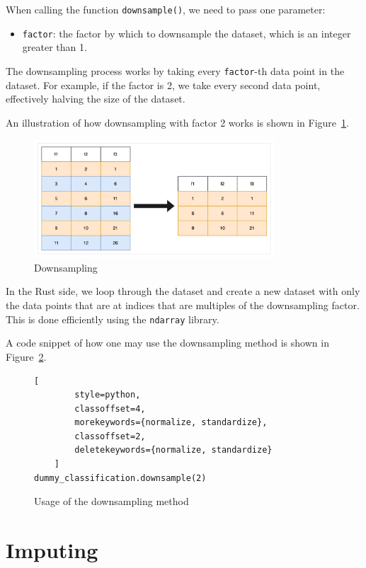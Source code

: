 \documentclass[review]{AIM_report}
\begin{document}
When calling the function \verb|downsample()|, we need to pass one parameter:
\begin{itemize}
    \item \verb|factor|: the factor by which to downsample the dataset, which is an integer greater than 1.
\end{itemize}

The downsampling process works by taking every \verb|factor|-th data point in the dataset. For example, if the factor is 2, we take every second data point, effectively halving the size of the dataset.

An illustration of how downsampling with factor 2 works is shown in Figure~\ref{fig:downsampling}.
\begin{figure}
    \centering
    \includegraphics[width=0.8\textwidth]{files/downsampling/downsampling.png}
    \caption{Downsampling}
    \label{fig:downsampling}
\end{figure}

In the Rust side, we loop through the dataset and create a new dataset with only the data points that are at indices that are multiples of the downsampling factor. This is done efficiently using the \texttt{ndarray} library.

A code snippet of how one may use the downsampling method is shown in Figure~\ref{fig:usage_downsampling}.
\begin{figure}[H]
    \begin{lstlisting}[
        style=python, 
        classoffset=4, 
        morekeywords={normalize, standardize}, 
        classoffset=2, 
        deletekeywords={normalize, standardize}
    ]
dummy_classification.downsample(2)
    \end{lstlisting}
    \caption{Usage of the downsampling method}
    \label{fig:usage_downsampling}
\end{figure}

\newpage
\section{Imputing}
\end{document}

